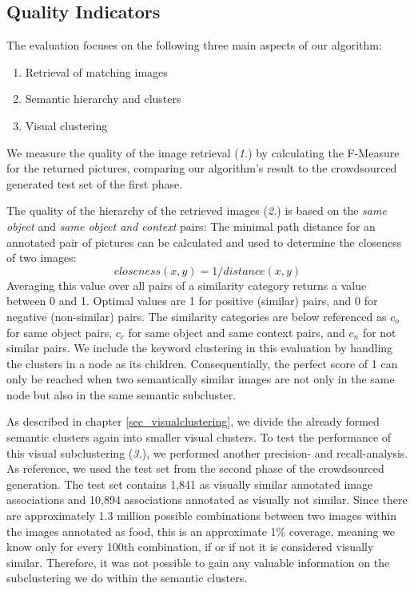 \subsection{Quality Indicators}
\label{sec_qualityindicators}
The evaluation focuses on the following three main aspects of our algorithm:
\begin{enumerate}
\item Retrieval of matching images
\item Semantic hierarchy and clusters
\item Visual clustering
\end{enumerate}

We measure the quality of the image retrieval (\emph{1.}) by calculating the F-Measure for the returned pictures, comparing our algorithm's result to the crowdsourced generated test set of the first phase.

The quality of the hierarchy of the retrieved images (\emph{2.}) is based on the \emph{same object} and \emph{same object and context} pairs: The  minimal path distance for an annotated pair of pictures can be calculated and used to determine the closeness of two images: \[closeness(x,y) = 1/distance(x,y)\]
Averaging this value over all pairs of a similarity category returns a value between 0 and 1. Optimal values are 1 for positive (similar) pairs, and 0 for negative (non-similar) pairs. The similarity categories are below referenced as $c_o$ for same object pairs, $c_c$ for same object and same context pairs, and $c_n$ for not similar pairs.
We include the keyword clustering in this evaluation by handling the clusters in a node as its children. Consequentially, the perfect score of 1 can only be reached when two semantically similar images are not only in the same node but also in the same semantic subcluster.

\bigskip
As described in chapter \ref{sec_visualclustering}, we divide the already formed semantic clusters again into smaller visual clusters.
To test the performance of this visual subclustering (\emph{3.}), we performed another precision- and recall-analysis.
As reference, we used the test set from the second phase of the crowdsourced generation.
The test set contains 1,841 as visually similar annotated image associations and 10,894 associations annotated as visually not similar.
Since there are approximately 1.3 million possible combinations between two images within the images annotated as food, this is an approximate 1\% coverage, meaning we know only for every 100th combination, if or if not it is considered visually similar.
Therefore, it was not possible to gain any valuable information on the subclustering we do within the semantic clusters.

